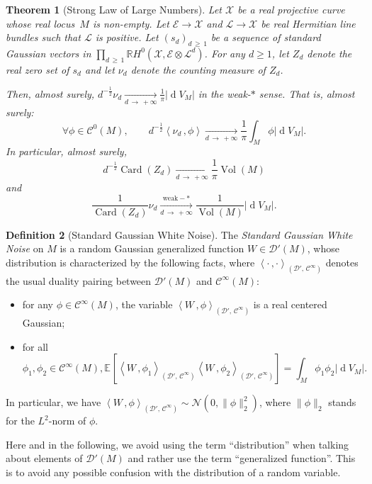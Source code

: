 \documentclass[10pt]{amsart}
\newtheorem{theo}{Theorem}[section]
\theoremstyle{definition}\newtheorem{defi}[theo]{Definition}\newtheorem{rema}[theo]{Remark}\newtheorem{exam}[theo]{Example}\newtheorem{exem}[theo]{Example}\newtheorem{nota}[theo]{Notation}
\DeclareMathOperator{\card}{Card}
\DeclareMathOperator{\dmesure}{d}
\DeclareMathOperator{\Vol}{Vol}
\newcommand{\D}{\mathcal{D}}
\newcommand{\E}{\mathcal{E}}
\newcommand{\X}{\mathcal{X}}
\renewcommand{\L}{\mathcal{L}}
\newcommand{\clN}{\mathcal{N}}
\newcommand{\clC}{\mathcal{C}}
\newcommand{\R}{\mathbb{R}}
\newcommand{\esp}[2][]{\mathbb{E}_{#1}\!\left[#2 \right]}
\newcommand{\norm}[1]{\left\lvert #1 \right\rvert}
\newcommand{\prsc}[2]{\left\langle #1\,, #2 \right\rangle}
\newcommand{\rmes}[1]{\norm{\dmesure\! V_{#1}}}
\newcommand{\vol}[1]{\Vol\!\left(#1\right)}
\renewcommand{\H}{H^0(\X,\E \otimes \L^d)}
\renewcommand{\geq}{\geqslant}
\let\oldforall\forall
\renewcommand*{\forall}{\mathrel{\oldforall}}
\begin{document}
\begin{theo}[{Strong Law of Large Numbers}]\label{thm law of large numbers}
Let $\X$ be a real projective curve whose real locus~$M$ is non-empty. Let $\E \to \X$ and $\L \to \X$ be real Hermitian line bundles such that $\L$ is positive. Let $(s_d)_{d\,\geq\,1}$ be a sequence of standard Gaussian vectors in $\prod_{d\, \geq\,1}\R \H$. For any $d \geq 1$, let $Z_d$ denote the real zero set of $s_d$ and let $\nu_d$ denote the counting measure of $Z_d$.

Then, almost surely, $d^{-\frac{1}{2}}\nu_d \xrightarrow[d\,\to\,+\infty]{} \frac{1}{\pi}\rmes{M}$ in the weak-$*$ sense. That is, almost surely:
\[
\forall \phi \in \clC^0(M), \qquad d^{-\frac{1}{2}}\prsc{\nu_d}{\phi} \xrightarrow[d\,\to\,+\infty]{} \frac{1}{\pi} \int_M \phi \rmes{M}.
\]
In particular, almost surely, 
\[
d^{-\frac{1}{2}}\card(Z_d) \xrightarrow[d\,\to\,+\infty]{} \frac{1}{\pi}\vol{M} 
\]
and
\[
\frac{1}{\card(Z_d)}\nu_d \xrightarrow[d \,\to\,+\infty]{\text{weak}-*} \frac{1}{\Vol(M)}\rmes{M}.
\]
\end{theo}

\begin{defi}[{Standard Gaussian White Noise}]\label{def W}
The \emph{Standard Gaussian White Noise} on $M$ is a random Gaussian generalized function $W \in \D'(M)$, whose distribution is characterized by the following facts, where $\prsc{\cdot}{\cdot}_{(\D',\,\clC^\infty)}$ denotes the usual duality pairing between $\D'(M)$ and $\clC^\infty(M)$:
\begin{itemize}
\item for any $\phi \in \clC^\infty(M)$, the variable $\prsc{W}{\phi}_{(\D',\,\clC^\infty)}$ is a real centered Gaussian;
\item for all 
\[
\phi_1,\phi_2 \in \clC^\infty(M), \esp{\prsc{W}{\phi_1}_{\left(\D',\,\clC^\infty\right)}\prsc{W}{\phi_2}_{\left(\D',\,\clC^\infty\right)}}= \int_M \phi_1 \phi_2 \rmes{M}.
\]
\end{itemize}
In particular, we have $\prsc{W}{\phi}_{(\D',\,\clC^\infty)} \sim \clN(0,\|\phi\|^2_2)$, where $\|\phi\|_2$ stands for the $L^2$-norm of $\phi$.
\end{defi}

Here and in the following, we avoid using the term ``distribution'' when talking about elements of $\D'(M)$ and rather use the term ``generalized function''. This is to avoid any possible confusion with the distribution of a random variable.
\end{document}
